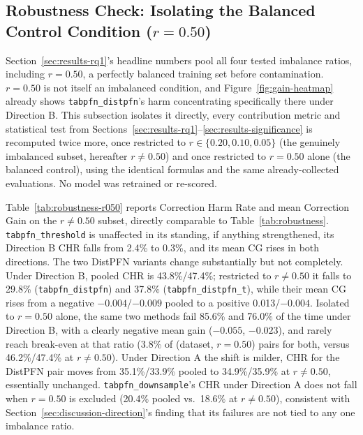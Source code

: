 \subsection{Robustness Check: Isolating the Balanced Control Condition ($r{=}0.50$)}
\label{sec:results-r050}

Section~\ref{sec:results-rq1}'s headline numbers pool all four tested
imbalance ratios, including $r{=}0.50$, a perfectly balanced training set
before contamination. $r{=}0.50$ is not itself an imbalanced condition,
and Figure~\ref{fig:gain-heatmap} already shows \texttt{tabpfn\_distpfn}'s
harm concentrating specifically there under Direction B. This subsection
isolates it directly, every contribution metric and statistical test from
Sections~\ref{sec:results-rq1}--\ref{sec:results-significance} is
recomputed twice more, once restricted to $r \in \{0.20, 0.10, 0.05\}$
(the genuinely imbalanced subset, hereafter $r{\neq}0.50$) and once
restricted to $r{=}0.50$ alone (the balanced control), using the
identical formulas and the same already-collected evaluations. No model
was retrained or re-scored.

Table~\ref{tab:robustness-r050} reports Correction Harm Rate and mean
Correction Gain on the $r{\neq}0.50$ subset, directly comparable to
Table~\ref{tab:robustness}. \texttt{tabpfn\_threshold} is unaffected in
its standing, if anything strengthened, its Direction B CHR falls from
2.4\% to 0.3\%, and its mean CG rises in both directions. The two DistPFN
variants change substantially but not completely. Under Direction B,
pooled CHR is 43.8\%/47.4\%; restricted to $r{\neq}0.50$ it falls to
29.8\% (\texttt{tabpfn\_distpfn}) and 37.8\% (\texttt{tabpfn\_distpfn\_t}),
while their mean CG rises from a negative $-0.004$/$-0.009$ pooled to a
positive 0.013/$-0.004$. Isolated to $r{=}0.50$ alone, the same two
methods fail 85.6\% and 76.0\% of the time under Direction B, with a
clearly negative mean gain ($-0.055$, $-0.023$), and rarely reach
break-even at that ratio (3.8\% of (dataset, $r{=}0.50$) pairs for both,
versus 46.2\%/47.4\% at $r{\neq}0.50$). Under Direction A the shift is
milder, CHR for the DistPFN pair moves from 35.1\%/33.9\% pooled to
34.9\%/35.9\% at $r{\neq}0.50$, essentially unchanged.
\texttt{tabpfn\_downsample}'s CHR under Direction A does not fall when
$r{=}0.50$ is excluded (20.4\% pooled vs.\ 18.6\% at $r{\neq}0.50$),
consistent with Section~\ref{sec:discussion-direction}'s finding that its
failures are not tied to any one imbalance ratio.

